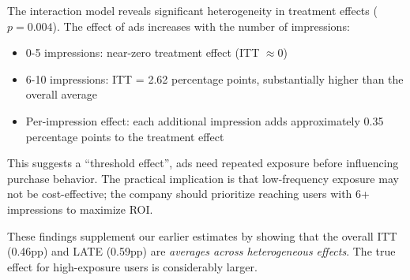 \documentclass[10pt]{article}
\begin{document}
The interaction model reveals significant heterogeneity in treatment effects ($p = 0.004 $). The effect of ads increases with the number of impressions: 
\begin{itemize}
    \item 0-5 impressions: near-zero treatment effect (ITT $\approx 0 $)
    \item 6-10 impressions: ITT = 2.62 percentage points, substantially higher than the overall average 
    \item Per-impression effect: each additional impression adds approximately 0.35 percentage points to the treatment effect 
\end{itemize}
This suggests a ``threshold effect'', ads need repeated exposure before influencing purchase behavior. The practical implication is that low-frequency exposure may not be cost-effective; the company should prioritize reaching users with 6+ impressions to maximize ROI. 

These findings supplement our earlier estimates by showing that the overall ITT (0.46pp) and LATE (0.59pp) are \textit{averages across heterogeneous effects}. The true effect for high-exposure users is considerably larger. 
\newpage
\end{document}
